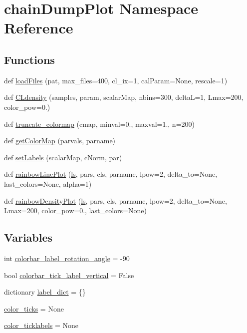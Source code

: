 \hypertarget{namespacechainDumpPlot}{}\section{chain\+Dump\+Plot Namespace Reference}
\label{namespacechainDumpPlot}
\subsection*{Functions}
\begin{DoxyCompactItemize}
\item 
def \mbox{\hyperlink{namespacechainDumpPlot_a2f615eaca5038b7db9b888ff93dfda6d}{load\+Files}} (pat, max\+\_\+files=400, cl\+\_\+ix=1, cal\+Param=None, rescale=1)
\item 
def \mbox{\hyperlink{namespacechainDumpPlot_a0fdd91b93b7b59f54d465fe430839bff}{C\+Ldensity}} (samples, param, scalar\+Map, nbins=300, deltaL=1, Lmax=200, color\+\_\+pow=0.)
\item 
def \mbox{\hyperlink{namespacechainDumpPlot_a13ab11787c4c59110336bce639925fdc}{truncate\+\_\+colormap}} (cmap, minval=0., maxval=1., n=200)
\item 
def \mbox{\hyperlink{namespacechainDumpPlot_abebc3286beb684f132f59c5e88dd80c3}{get\+Color\+Map}} (parvals, parname)
\item 
def \mbox{\hyperlink{namespacechainDumpPlot_ad7ceae1d45162491d4aded137ea0d167}{set\+Labels}} (scalar\+Map, c\+Norm, par)
\item 
def \mbox{\hyperlink{namespacechainDumpPlot_a545569f988e5fb4e1743898514441b06}{rainbow\+Line\+Plot}} (\mbox{\hyperlink{plotTT_8m_aac1113e50f7f1460beeaeeba69f63701}{ls}}, pars, cls, parname, lpow=2, delta\+\_\+to=None, last\+\_\+colors=None, alpha=1)
\item 
def \mbox{\hyperlink{namespacechainDumpPlot_a2f98303b7ab27e2bf0bf6831e673b79f}{rainbow\+Density\+Plot}} (\mbox{\hyperlink{plotTT_8m_aac1113e50f7f1460beeaeeba69f63701}{ls}}, pars, cls, parname, lpow=2, delta\+\_\+to=None, Lmax=200, color\+\_\+pow=0., last\+\_\+colors=None)
\end{DoxyCompactItemize}
\subsection*{Variables}
\begin{DoxyCompactItemize}
\item 
int \mbox{\hyperlink{namespacechainDumpPlot_af57a15d6c72263c3248617611794b17e}{colorbar\+\_\+label\+\_\+rotation\+\_\+angle}} = -\/90
\item 
bool \mbox{\hyperlink{namespacechainDumpPlot_a46252505df64fd7ec006145413d6d636}{colorbar\+\_\+tick\+\_\+label\+\_\+vertical}} = False
\item 
dictionary \mbox{\hyperlink{namespacechainDumpPlot_aa13865e3d9d72f53f82ad8b5340b2051}{label\+\_\+dict}} = \{\}
\item 
\mbox{\hyperlink{namespacechainDumpPlot_a7817b6799edc7bb843b6269462671074}{color\+\_\+ticks}} = None
\item 
\mbox{\hyperlink{namespacechainDumpPlot_a8871c58ca012f148e566ab779c3a1ab5}{color\+\_\+ticklabels}} = None
\end{DoxyCompactItemize}


